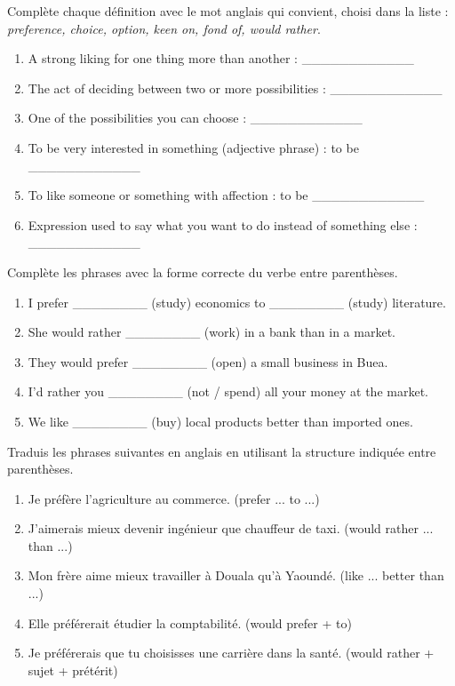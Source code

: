 \documentclass[11pt]{article}
\newcounter{popsec}
\newcounter{popsub}
\newcommand{\courssub}[1]{%
  \stepcounter{popsub}%
  \par\vspace{9pt}\noindent{\popxbold\fontsize{11.5}{13}\selectfont\color{popink}{\color{poporange}\thepopsec.\thepopsub}\hspace{6pt}#1}\par\nopagebreak\vspace{4pt}
}
\begin{document}
\begin{exercice}
Complète chaque définition avec le mot anglais qui convient, choisi dans la liste : \emph{preference, choice, option, keen on, fond of, would rather}.
\begin{enumerate}
\item A strong liking for one thing more than another : \_\_\_\_\_\_\_\_\_\_\_\_
\item The act of deciding between two or more possibilities : \_\_\_\_\_\_\_\_\_\_\_\_
\item One of the possibilities you can choose : \_\_\_\_\_\_\_\_\_\_\_\_
\item To be very interested in something (adjective phrase) : to be \_\_\_\_\_\_\_\_\_\_\_\_
\item To like someone or something with affection : to be \_\_\_\_\_\_\_\_\_\_\_\_
\item Expression used to say what you want to do instead of something else : \_\_\_\_\_\_\_\_\_\_\_\_
\end{enumerate}
\end{exercice}

\begin{exercice}
Complète les phrases avec la forme correcte du verbe entre parenthèses.
\begin{enumerate}
\item I prefer \_\_\_\_\_\_\_\_ (study) economics to \_\_\_\_\_\_\_\_ (study) literature.
\item She would rather \_\_\_\_\_\_\_\_ (work) in a bank than in a market.
\item They would prefer \_\_\_\_\_\_\_\_ (open) a small business in Buea.
\item I'd rather you \_\_\_\_\_\_\_\_ (not / spend) all your money at the market.
\item We like \_\_\_\_\_\_\_\_ (buy) local products better than imported ones.
\end{enumerate}
\end{exercice}

\courssub{Je m'entraîne}

\begin{exercice}[Traduction]
Traduis les phrases suivantes en anglais en utilisant la structure indiquée entre parenthèses.
\begin{enumerate}
\item Je préfère l'agriculture au commerce. (prefer ... to ...)
\item J'aimerais mieux devenir ingénieur que chauffeur de taxi. (would rather ... than ...)
\item Mon frère aime mieux travailler à Douala qu'à Yaoundé. (like ... better than ...)
\item Elle préférerait étudier la comptabilité. (would prefer + to)
\item Je préférerais que tu choisisses une carrière dans la santé. (would rather + sujet + prétérit)
\end{enumerate}
\end{exercice}
\end{document}
